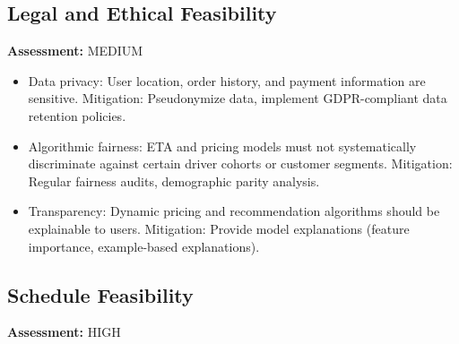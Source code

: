 \documentclass[12pt,a4paper]{report}
\begin{document}
\subsection{Legal and Ethical Feasibility}

\textbf{Assessment:} MEDIUM

\begin{itemize}
    \item Data privacy: User location, order history, and payment information are sensitive. Mitigation: Pseudonymize data, implement GDPR-compliant data retention policies.
    \item Algorithmic fairness: ETA and pricing models must not systematically discriminate against certain driver cohorts or customer segments. Mitigation: Regular fairness audits, demographic parity analysis.
    \item Transparency: Dynamic pricing and recommendation algorithms should be explainable to users. Mitigation: Provide model explanations (feature importance, example-based explanations).
\end{itemize}

\subsection{Schedule Feasibility}

\textbf{Assessment:} HIGH
\end{document}
